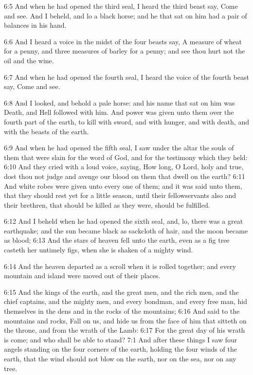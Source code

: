 6:5 And when he had opened the third seal, I heard the third beast
say, Come and see. And I beheld, and lo a black horse; and he that sat
on him had a pair of balances in his hand.

6:6 And I heard a voice in the midst of the four beasts say, A measure
of wheat for a penny, and three measures of barley for a penny; and
see thou hurt not the oil and the wine.

6:7 And when he had opened the fourth seal, I heard the voice of the
fourth beast say, Come and see.

6:8 And I looked, and behold a pale horse: and his name that sat on
him was Death, and Hell followed with him. And power was given unto
them over the fourth part of the earth, to kill with sword, and with
hunger, and with death, and with the beasts of the earth.

6:9 And when he had opened the fifth seal, I saw under the altar the
souls of them that were slain for the word of God, and for the
testimony which they held: 6:10 And they cried with a loud voice,
saying, How long, O Lord, holy and true, dost thou not judge and
avenge our blood on them that dwell on the earth?  6:11 And white
robes were given unto every one of them; and it was said unto them,
that they should rest yet for a little season, until their
fellowservants also and their brethren, that should be killed as they
were, should be fulfilled.

6:12 And I beheld when he had opened the sixth seal, and, lo, there
was a great earthquake; and the sun became black as sackcloth of hair,
and the moon became as blood; 6:13 And the stars of heaven fell unto
the earth, even as a fig tree casteth her untimely figs, when she is
shaken of a mighty wind.

6:14 And the heaven departed as a scroll when it is rolled together;
and every mountain and island were moved out of their places.

6:15 And the kings of the earth, and the great men, and the rich men,
and the chief captains, and the mighty men, and every bondman, and
every free man, hid themselves in the dens and in the rocks of the
mountains; 6:16 And said to the mountains and rocks, Fall on us, and
hide us from the face of him that sitteth on the throne, and from the
wrath of the Lamb: 6:17 For the great day of his wrath is come; and
who shall be able to stand?  7:1 And after these things I saw four
angels standing on the four corners of the earth, holding the four
winds of the earth, that the wind should not blow on the earth, nor on
the sea, nor on any tree.

